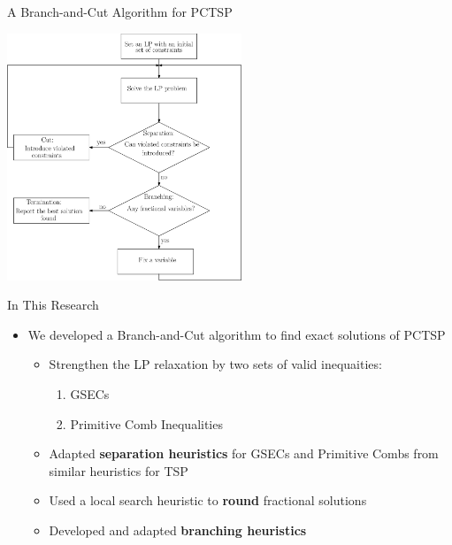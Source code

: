 \documentclass[10pt]{beamer}
\begin{document}
\begin{frame}{A Branch-and-Cut Algorithm for PCTSP}
\begin{center}
        \includegraphics[width=7cm]{Branch_and_Cut.eps} 
\end{center}
\end{frame}

\begin{frame}[t]{In This Research}
    \begin{itemize}
        \item<1-> We developed a \alert{Branch-and-Cut} algorithm to find exact solutions of PCTSP
            \begin{itemize}
                \item<2-> Strengthen the LP relaxation by two sets of valid inequaities:
                    \begin{enumerate}
                        \item<3-> GSECs
                        \item<4-> Primitive Comb Inequalities
                    \end{enumerate}
                \item<5-> Adapted \textbf{separation heuristics} for GSECs and Primitive Combs from similar heuristics for TSP
                \item<6-> Used a  local search heuristic to \textbf{round} fractional solutions
                \item<7-> Developed and adapted \textbf{branching heuristics}
            \end{itemize}
    \end{itemize}
\end{frame}
\end{document}
